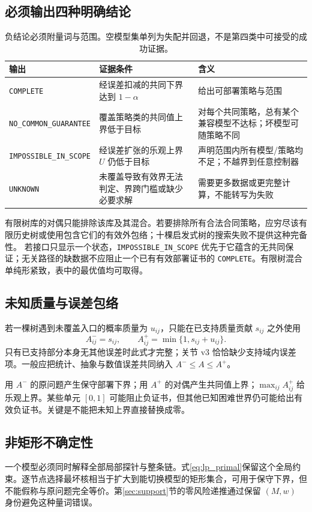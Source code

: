 \documentclass[11pt,a4paper,fontset=fandol]{ctexart}
\theoremstyle{definition}
\theoremstyle{remark}\newtheorem{remark}[theorem]{说明}
\numberwithin{equation}{section}
\begin{document}
\subsection{必须输出四种明确结论}
\begin{table}[htbp]\centering\small
\begin{tabularx}{\linewidth}{P{.27\linewidth}YY}\toprule
输出 & 证据条件 & 含义\\\midrule
\texttt{COMPLETE} & 经误差扣减的共同下界达到 $1-\alpha$ & 给出可部署策略与范围\\
\texttt{NO\_COMMON\_GUARANTEE} & 覆盖策略类的共同值上界低于目标 & 对每个共同策略，总有某个兼容模型不达标；坏模型可随策略不同\\
\texttt{IMPOSSIBLE\_IN\_SCOPE} & 经误差扩张的乐观上界 $U$ 仍低于目标 & 声明范围内所有模型/策略均不足；不越界到任意控制器\\
\texttt{UNKNOWN} & 未覆盖导致有效界无法判定、界跨门槛或缺少必要求解 & 需要更多数据或更完整计算，不能转写为失败\\\bottomrule
\end{tabularx}
\caption{负结论必须附量词与范围。空模型集单列为失配并回退，不是第四类中可接受的成功证据。}
\label{tab:status}
\end{table}
有限树库的对偶只能排除该库及其混合。若要排除所有合法合同策略，应穷尽该有限历史树或使用包含它们的有效外包络；十棵启发式树的搜索失败不提供这种完备性。
若接口只显示一个状态，\texttt{IMPOSSIBLE\_IN\_SCOPE} 优先于它蕴含的无共同保证；无关路径的缺数据不应阻止一个已有有效部署证书的 \texttt{COMPLETE}。有限树混合单纯形紧致，表中的最优值均可取得。

\subsection{未知质量与误差包络}
若一棵树遇到未覆盖入口的概率质量为 $u_{ij}$，只能在已支持质量贡献 $s_{ij}$ 之外使用
\begin{equation}
 A^-_{ij}=s_{ij},\qquad A^+_{ij}=\min\{1,s_{ij}+u_{ij}\}.
 \label{eq:unknown}
\end{equation}
只有已支持部分本身无其他误差时此式才完整；关节 v3 恰恰缺少支持域内误差项。一般应把统计、抽象与数值误差共同纳入 $A^-\le A\le A^+$。

用 $A^-$ 的原问题产生保守部署下界；用 $A^+$ 的对偶产生共同值上界；$\max_{ij}A^+_{ij}$ 给乐观上界。某些单元 $[0,1]$ 可能阻止负证书，但其他已知困难世界仍可能给出有效负证书。关键是不能把未知上界直接替换成零。

\subsection{非矩形不确定性}
一个模型必须同时解释全部局部探针与整条链。式\eqref{eq:lp_primal}保留这个全局约束。逐节点选择最坏核相当于扩大到能切换模型的矩形集合，可用于保守下界，但不能假称与原问题完全等价。第\ref{sec:support}节的零风险递推通过保留 $(M,w)$ 身份避免这种量词错误。
\end{document}
